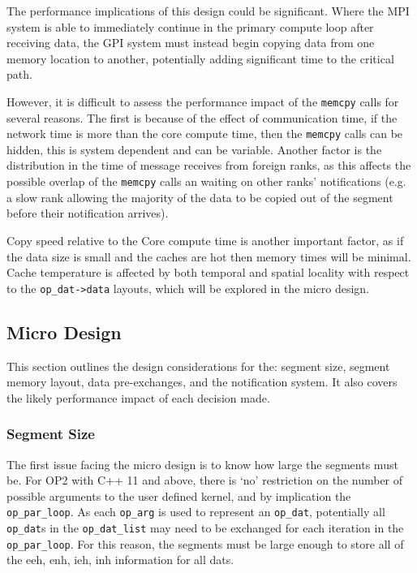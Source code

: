 The performance implications of this design could be significant. Where the MPI system is able to immediately continue in the primary compute loop after receiving data, the GPI system must instead begin copying data from one memory location to another, potentially adding significant time to the critical path. 

However, it is difficult to assess the performance impact of the \texttt{memcpy} calls for several reasons. The first is because of the effect of communication time, if the network time is more than the core compute time, then the \texttt{memcpy} calls can be hidden, this is system dependent and can be variable. Another factor is the distribution in the time of message receives from foreign ranks, as this affects the possible overlap of the \texttt{memcpy} calls an waiting on other ranks' notifications (e.g. a slow rank allowing the majority of the data to be copied out of the segment before their notification arrives).

Copy speed relative to the Core compute time is another important factor, as if the data size is small and the caches are hot then memory times will be minimal. Cache temperature is affected by both temporal and spatial locality with respect to the \texttt{op\_dat->data} layouts, which will be explored in the micro design.

\subsection{Micro Design}
This section outlines the design considerations for the: segment size, segment memory layout, data pre-exchanges, and the notification system. It also covers the likely performance impact of each decision made. 

\subsubsection{Segment Size}
The first issue facing the micro design is to know how large the segments must be. For OP2 with C++ 11 and above, there is `no' restriction on the number of possible arguments to the user defined kernel, and by implication the \texttt{op\_par\_loop}. As each \texttt{op\_arg} is used to represent an \texttt{op\_dat}, potentially all \texttt{op\_dat}s in the \texttt{op\_dat\_list} may need to be exchanged for each iteration in the \texttt{op\_par\_loop}. For this reason, the segments must be large enough to store all of the eeh, enh, ieh, inh information for all dats. 

